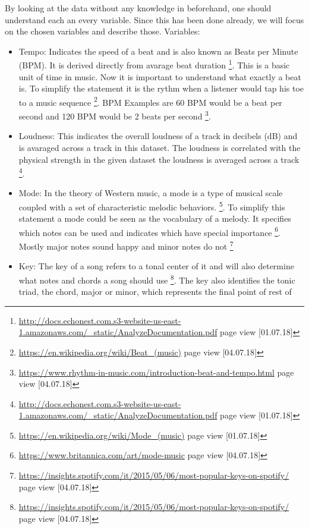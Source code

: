 \documentclass[]{article}
\let\rmarkdownfootnote\footnote%
\def\footnote{\protect\rmarkdownfootnote}
\begin{document}
By looking at the data without any knowledge in beforehand, one should
understand each an every variable. Since this has been done already, we
will focus on the chosen variables and describe those. Variables:

\begin{itemize}
\item
  Tempo: Indicates the speed of a beat and is also known as Beats per
  Minute (BPM). It is derived directly from avarage beat duration
  \footnote{\url{http://docs.echonest.com.s3-website-us-east-1.amazonaws.com/_static/AnalyzeDocumentation.pdf}
    page view {[}01.07.18{]}}. This is a basic unit of time in music.
  Now it is important to understand what exactly a beat is. To simplify
  the statement it is the rythm when a listener would tap his toe to a
  music sequence \footnote{\url{https://en.wikipedia.org/wiki/Beat_(music)}
    page view {[}04.07.18{]}}. BPM Examples are 60 BPM would be a beat
  per second and 120 BPM would be 2 beats per second \footnote{\url{https://www.rhythm-in-music.com/introduction-beat-and-tempo.html}
    page view {[}04.07.18{]}}. 
\item
  Loudness: This indicates the overall loudness of a track in decibels
  (dB) and is avaraged across a track in this dataset. The loudness is
  correlated with the physical strength in the given dataset the
  loudness is averaged across a track \footnote{\url{http://docs.echonest.com.s3-website-us-east-1.amazonaws.com/_static/AnalyzeDocumentation.pdf}
    page view {[}01.07.18{]}}. 
\item
  Mode: In the theory of Western music, a mode is a type of musical
  scale coupled with a set of characteristic melodic behaviors.
  \footnote{\url{https://en.wikipedia.org/wiki/Mode_(music)} page view
    {[}01.07.18{]}}. To simplify this statement a mode could be seen as
  the vocabulary of a melody. It specifies which notes can be used and
  indicates which have special importance \footnote{\url{https://www.britannica.com/art/mode-music}
    page view {[}04.07.18{]}}. Mostly major notes sound happy and minor
  notes do not \footnote{\url{https://insights.spotify.com/it/2015/05/06/most-popular-keys-on-spotify/}
    page view {[}04.07.18{]}} 
\item
  Key: The key of a song refers to a tonal center of it and will also
  determine what notes and chords a song should use \footnote{\url{https://insights.spotify.com/it/2015/05/06/most-popular-keys-on-spotify/}
    page view {[}04.07.18{]}}. The key also identifies the tonic triad,
  the chord, major or minor, which represents the final point of rest of

\end{itemize}
\end{document}
